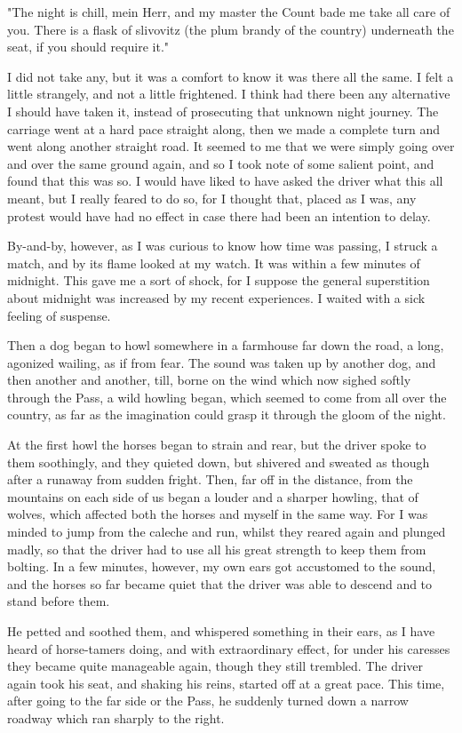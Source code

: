 "The night is chill, mein Herr, and my master the Count bade me take all care of you. There is a flask of slivovitz (the plum brandy of the country) underneath the seat, if you should require it."

I did not take any, but it was a comfort to know it was there all the same. I felt a little strangely, and not a little frightened. I think had there been any alternative I should have taken it, instead of prosecuting that unknown night journey. The carriage went at a hard pace straight along, then we made a complete turn and went along another straight road. It seemed to me that we were simply going over and over the same ground again, and so I took note of some salient point, and found that this was so. I would have liked to have asked the driver what this all meant, but I really feared to do so, for I thought that, placed as I was, any protest would have had no effect in case there had been an intention to delay.

By-and-by, however, as I was curious to know how time was passing, I struck a match, and by its flame looked at my watch. It was within a few minutes of midnight. This gave me a sort of shock, for I suppose the general superstition about midnight was increased by my recent experiences. I waited with a sick feeling of suspense.

Then a dog began to howl somewhere in a farmhouse far down the road, a long, agonized wailing, as if from fear. The sound was taken up by another dog, and then another and another, till, borne on the wind which now sighed softly through the Pass, a wild howling began, which seemed to come from all over the country, as far as the imagination could grasp it through the gloom of the night.

At the first howl the horses began to strain and rear, but the driver spoke to them soothingly, and they quieted down, but shivered and sweated as though after a runaway from sudden fright. Then, far off in the distance, from the mountains on each side of us began a louder and a sharper howling, that of wolves, which affected both the horses and myself in the same way. For I was minded to jump from the caleche and run, whilst they reared again and plunged madly, so that the driver had to use all his great strength to keep them from bolting. In a few minutes, however, my own ears got accustomed to the sound, and the horses so far became quiet that the driver was able to descend and to stand before them.

He petted and soothed them, and whispered something in their ears, as I have heard of horse-tamers doing, and with extraordinary effect, for under his caresses they became quite manageable again, though they still trembled. The driver again took his seat, and shaking his reins, started off at a great pace. This time, after going to the far side or the Pass, he suddenly turned down a narrow roadway which ran sharply to the right.

